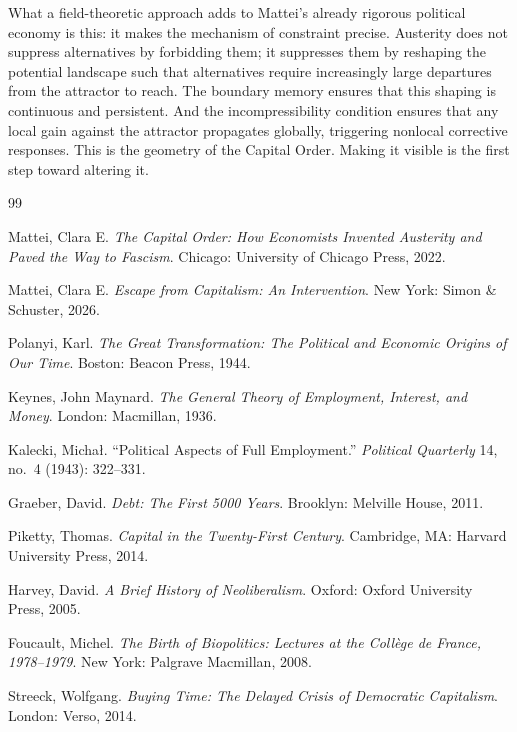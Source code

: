 \documentclass[12pt,a4paper]{article}
\begin{document}
What a field-theoretic approach adds to Mattei's already rigorous political economy is this: it makes the mechanism of constraint precise. Austerity does not suppress alternatives by forbidding them; it suppresses them by reshaping the potential landscape such that alternatives require increasingly large departures from the attractor to reach. The boundary memory ensures that this shaping is continuous and persistent. And the incompressibility condition ensures that any local gain against the attractor propagates globally, triggering nonlocal corrective responses. This is the geometry of the Capital Order. Making it visible is the first step toward altering it.

\vspace{12pt}

\begin{thebibliography}{99}

Mattei, Clara E.
\textit{The Capital Order: How Economists Invented Austerity and Paved the Way to Fascism}.
Chicago: University of Chicago Press, 2022.

Mattei, Clara E.
\textit{Escape from Capitalism: An Intervention}.
New York: Simon \& Schuster, 2026.

Polanyi, Karl.
\textit{The Great Transformation: The Political and Economic Origins of Our Time}.
Boston: Beacon Press, 1944.

Keynes, John Maynard.
\textit{The General Theory of Employment, Interest, and Money}.
London: Macmillan, 1936.

Kalecki, Micha\l.
``Political Aspects of Full Employment.''
\textit{Political Quarterly} 14, no.\ 4 (1943): 322--331.

Graeber, David.
\textit{Debt: The First 5000 Years}.
Brooklyn: Melville House, 2011.

Piketty, Thomas.
\textit{Capital in the Twenty-First Century}.
Cambridge, MA: Harvard University Press, 2014.

Harvey, David.
\textit{A Brief History of Neoliberalism}.
Oxford: Oxford University Press, 2005.

Foucault, Michel.
\textit{The Birth of Biopolitics: Lectures at the Coll\`ege de France, 1978--1979}.
New York: Palgrave Macmillan, 2008.

Streeck, Wolfgang.
\textit{Buying Time: The Delayed Crisis of Democratic Capitalism}.
London: Verso, 2014.


\end{thebibliography}
\end{document}
